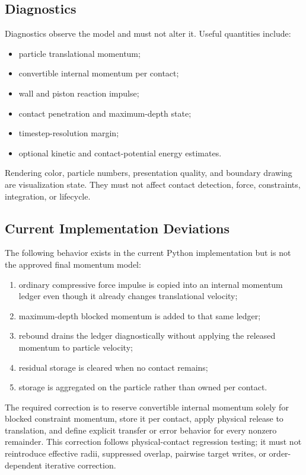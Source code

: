 \subsection{Diagnostics}

Diagnostics observe the model and must not alter it.  Useful quantities
include:

\begin{itemize}
    \item particle translational momentum;
    \item convertible internal momentum per contact;
    \item wall and piston reaction impulse;
    \item contact penetration and maximum-depth state;
    \item timestep-resolution margin;
    \item optional kinetic and contact-potential energy estimates.
\end{itemize}

Rendering color, particle numbers, presentation quality, and boundary drawing
are visualization state.  They must not affect contact detection, force,
constraints, integration, or lifecycle.

\subsection{Current Implementation Deviations}

The following behavior exists in the current Python implementation but is not
the approved final momentum model:

\begin{enumerate}
    \item ordinary compressive force impulse is copied into an internal
          momentum ledger even though it already changes translational
          velocity;
    \item maximum-depth blocked momentum is added to that same ledger;
    \item rebound drains the ledger diagnostically without applying the
          released momentum to particle velocity;
    \item residual storage is cleared when no contact remains;
    \item storage is aggregated on the particle rather than owned per contact.
\end{enumerate}

The required correction is to reserve convertible internal momentum solely for
blocked constraint momentum, store it per contact, apply physical release to
translation, and define explicit transfer or error behavior for every nonzero
remainder.  This correction follows physical-contact regression testing; it
must not reintroduce effective radii, suppressed overlap, pairwise target
writes, or order-dependent iterative correction.


